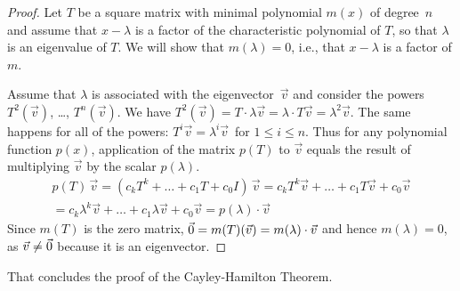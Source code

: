 \begin{proof}
Let \( T \) be a square matrix with minimal polynomial \( m(x) \) 
of degree~\( n \) and 
assume that \( x-\lambda \) is a factor of the characteristic polynomial of 
\( T \), so that \( \lambda \) is an eigenvalue of \( T \).
We will show that $m(\lambda)=0$, i.e., that $x-\lambda$ is a factor of $m$.

Assume that $\lambda$ is associated with the eigenvector~$\vec{v}$ and
consider the powers $T^2(\vec{v})$, \ldots, \( T^n(\vec{v}) \).
We have
$T^2(\vec{v})
=T\cdot\lambda\vec{v}=\lambda\cdot T\vec{v}=\lambda^2\vec{v}$.
The same happens for all of the powers: 
$T^i\vec{v}=\lambda^i\vec{v}\,$ for \( 1\leq i \leq n \).
Thus
for any polynomial function \( p(x) \), application of the matrix \( p(T) \)
to \( \vec{v} \) equals the result of multiplying \( \vec{v} \) by the scalar
\( p(\lambda) \).
\begin{multline*}
  p(T)\,\vec{v}
  =(c_kT^k+\dots+c_1T+c_0I)\,\vec{v}
  =c_kT^k\vec{v}+\dots+c_1T\vec{v}+c_0\vec{v}  \\
  =c_k\lambda^k\vec{v}+\dots+c_1\lambda\vec{v}+c_0\vec{v}
  =p(\lambda)\cdot\vec{v}
\end{multline*}
Since \( m(T) \) is the zero matrix,
\( \vec{0}=m(T)(\vec{v})=m(\lambda)\cdot\vec{v} \) and
hence \( m(\lambda)=0 \), as \( \vec{v}\neq\vec{0} \) 
because it is an eigenvector.
\end{proof}

That concludes the proof of the Cayley-Hamilton Theorem.

